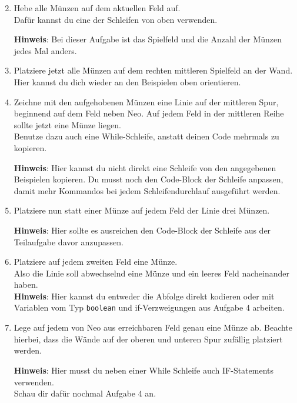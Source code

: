 \begin{enumerate} \setcounter{enumi}{1}
    \item Hebe alle Münzen auf dem aktuellen Feld auf.\\
    Dafür kannst du eine der Schleifen von oben verwenden.
    
    \textbf{Hinweis}: Bei dieser Aufgabe ist das Spielfeld und die Anzahl der Münzen jedes Mal anders.
    \item Platziere jetzt alle Münzen auf dem rechten mittleren Spielfeld an der Wand.
    Hier kannst du dich wieder an den Beispielen oben orientieren.
    \item Zeichne mit den aufgehobenen Münzen eine Linie auf der mittleren Spur, beginnend auf dem Feld neben Neo.
    Auf jedem Feld in der mittleren Reihe sollte jetzt eine Münze liegen.\\
    Benutze dazu auch eine While-Schleife, anstatt deinen Code mehrmals zu kopieren.
    
    \textbf{Hinweis}: Hier kannst du nicht direkt eine Schleife von den angegebenen Beispielen kopieren.
    Du musst noch den Code-Block der Schleife anpassen, damit mehr Kommandos bei jedem Schleifendurchlauf ausgeführt werden.
    \item Platziere nun statt einer Münze auf jedem Feld der Linie drei Münzen.
    
    \textbf{Hinweis}: Hier sollte es ausreichen den Code-Block der Schleife aus der Teilaufgabe davor anzupassen.
    \item Platziere auf jedem zweiten Feld eine Münze.\\
    Also die Linie soll abwechselnd eine Münze und ein leeres Feld nacheinander haben.\\
    
    \textbf{Hinweis}: Hier kannst du entweder die Abfolge direkt kodieren oder mit Variablen vom Typ \lstinline{boolean} und if-Verzweigungen aus Aufgabe 4 arbeiten.
    \item \optional Lege auf jedem von Neo aus erreichbaren Feld genau eine Münze ab.
    Beachte hierbei, dass die Wände auf der oberen und unteren Spur zufällig platziert werden.
    
    \textbf{Hinweis}: Hier musst du neben einer While Schleife auch IF-Statements verwenden.\\
    Schau dir dafür nochmal Aufgabe 4 an.
\end{enumerate}
